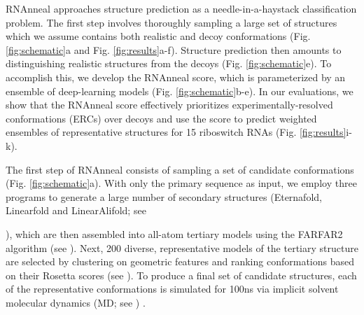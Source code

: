 \documentclass[%
aip,
 amsmath,amssymb,
reprint,%
onecolumn,
]{revtex4-1}
\begin{document}
RNAnneal approaches structure prediction as a needle-in-a-haystack classification problem. The first step involves thoroughly sampling a large set of structures which we assume contains both realistic and decoy conformations (Fig. \ref{fig:schematic}a and Fig. \ref{fig:results}a-f). Structure prediction then amounts to distinguishing realistic structures from the decoys (Fig. \ref{fig:schematic}e). To accomplish this, we develop the RNAnneal score, which is parameterized by an ensemble of deep-learning models (Fig. \ref{fig:schematic}b-e). In our evaluations, we show that the RNAnneal score effectively prioritizes experimentally-resolved conformations (ERCs) over decoys and use the score to predict weighted ensembles of representative structures for 15 riboswitch RNAs (Fig. \ref{fig:results}i-k).

The first step of RNAnneal consists of sampling a set of candidate conformations (Fig. \ref{fig:schematic}a). With only the primary sequence as input, we employ three programs to generate a large number of secondary structures (Eternafold, Linearfold and LinearAlifold; see {), which are then assembled into all-atom tertiary models using the FARFAR2 algorithm (see ).\cite{huang2019linearfold,wayment2022rna,malik2024linearalifold,watkins2020farfar2} Next, 200 diverse, representative models of the tertiary structure are selected by clustering on geometric features and ranking conformations based on their Rosetta scores (see  ). To produce a final set of candidate structures, each of the representative conformations is simulated for 100ns via implicit solvent molecular dynamics (MD; see ) . 

}
\end{document}
